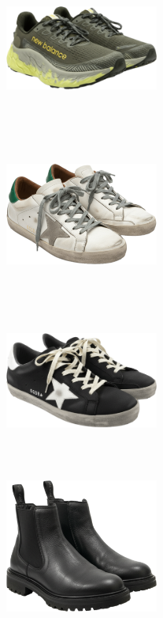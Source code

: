 \documentclass[10pt]{article}
\begin{document}
\begin{minipage}[c][50.60mm][c]{50.60mm}\centering
\includegraphics[width=50.60mm,height=50.60mm,keepaspectratio]{assets/shoes/new-balance-large-sole-military-green.png}\
\end{minipage} \hspace*{6.00mm} \begin{minipage}[c][50.60mm][c]{50.60mm}\centering
\includegraphics[width=50.60mm,height=50.60mm,keepaspectratio]{assets/shoes/golden-goose-bianche-verdi.png}\
\end{minipage} \hspace*{6.00mm} \begin{minipage}[c][50.60mm][c]{50.60mm}\centering
\includegraphics[width=50.60mm,height=50.60mm,keepaspectratio]{assets/shoes/golden-goose-nere.png}\
\end{minipage} \hspace*{6.00mm} \begin{minipage}[c][50.60mm][c]{50.60mm}\centering
\includegraphics[width=50.60mm,height=50.60mm,keepaspectratio]{assets/shoes/black-chelsea-boots.png}\

\end{minipage}
\end{document}
